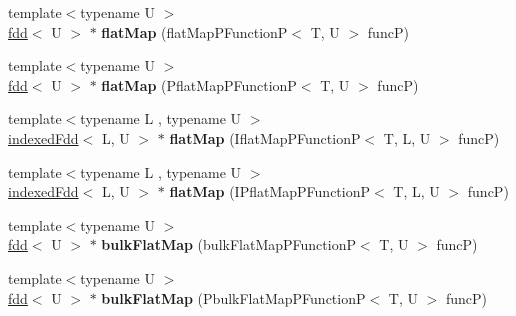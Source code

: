 \begin{DoxyCompactItemize}
\item 
\hypertarget{classfaster_1_1fdd_3_01T_01_5_01_4_af490d108ce1a30dc4210a1d8b557df97}{}{\footnotesize template$<$typename U $>$ }\\\hyperlink{classfaster_1_1fdd}{fdd}$<$ U $>$ $\ast$ {\bfseries flat\+Map} (flat\+Map\+P\+Function\+P$<$ T, U $>$ func\+P)\label{classfaster_1_1fdd_3_01T_01_5_01_4_af490d108ce1a30dc4210a1d8b557df97}

\item 
\hypertarget{classfaster_1_1fdd_3_01T_01_5_01_4_a5fad18905c1f51701c823959d520b075}{}{\footnotesize template$<$typename U $>$ }\\\hyperlink{classfaster_1_1fdd}{fdd}$<$ U $>$ $\ast$ {\bfseries flat\+Map} (Pflat\+Map\+P\+Function\+P$<$ T, U $>$ func\+P)\label{classfaster_1_1fdd_3_01T_01_5_01_4_a5fad18905c1f51701c823959d520b075}

\item 
\hypertarget{classfaster_1_1fdd_3_01T_01_5_01_4_a03c1134e4e6770f0dad78d073ad36c48}{}{\footnotesize template$<$typename L , typename U $>$ }\\\hyperlink{classfaster_1_1indexedFdd}{indexed\+Fdd}$<$ L, U $>$ $\ast$ {\bfseries flat\+Map} (Iflat\+Map\+P\+Function\+P$<$ T, L, U $>$ func\+P)\label{classfaster_1_1fdd_3_01T_01_5_01_4_a03c1134e4e6770f0dad78d073ad36c48}

\item 
\hypertarget{classfaster_1_1fdd_3_01T_01_5_01_4_a4d183f4e1d6545769022d805a2d841f6}{}{\footnotesize template$<$typename L , typename U $>$ }\\\hyperlink{classfaster_1_1indexedFdd}{indexed\+Fdd}$<$ L, U $>$ $\ast$ {\bfseries flat\+Map} (I\+Pflat\+Map\+P\+Function\+P$<$ T, L, U $>$ func\+P)\label{classfaster_1_1fdd_3_01T_01_5_01_4_a4d183f4e1d6545769022d805a2d841f6}

\item 
\hypertarget{classfaster_1_1fdd_3_01T_01_5_01_4_a7519a944f8bef5f27466d341f39bbb0e}{}{\footnotesize template$<$typename U $>$ }\\\hyperlink{classfaster_1_1fdd}{fdd}$<$ U $>$ $\ast$ {\bfseries bulk\+Flat\+Map} (bulk\+Flat\+Map\+P\+Function\+P$<$ T, U $>$ func\+P)\label{classfaster_1_1fdd_3_01T_01_5_01_4_a7519a944f8bef5f27466d341f39bbb0e}

\item 
\hypertarget{classfaster_1_1fdd_3_01T_01_5_01_4_a91e2f6a811a43d36a26e022d92704b3f}{}{\footnotesize template$<$typename U $>$ }\\\hyperlink{classfaster_1_1fdd}{fdd}$<$ U $>$ $\ast$ {\bfseries bulk\+Flat\+Map} (Pbulk\+Flat\+Map\+P\+Function\+P$<$ T, U $>$ func\+P)\label{classfaster_1_1fdd_3_01T_01_5_01_4_a91e2f6a811a43d36a26e022d92704b3f}


\end{DoxyCompactItemize}
